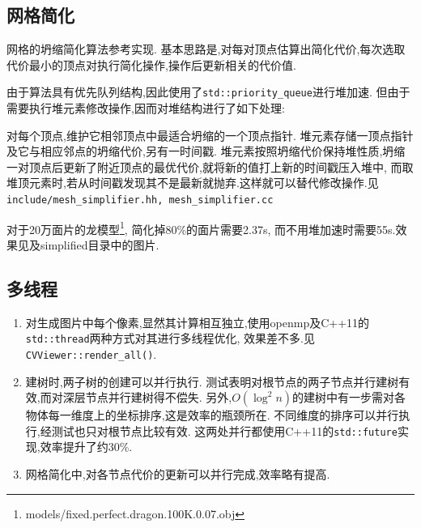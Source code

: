 \subsection{网格简化}
网格的坍缩简化算法参考\cite{mesh}实现.
基本思路是,对每对顶点估算出简化代价,每次选取代价最小的顶点对执行简化操作,操作后更新相关的代价值.

由于算法具有优先队列结构,因此使用了\verb|std::priority_queue|进行堆加速.
但由于需要执行堆元素修改操作,因而对堆结构进行了如下处理:

对每个顶点,维护它相邻顶点中最适合坍缩的一个顶点指针.
堆元素存储一顶点指针及它与相应邻点的坍缩代价,另有一时间戳.
堆元素按照坍缩代价保持堆性质,坍缩一对顶点后更新了附近顶点的最优代价,就将新的值打上新的时间戳压入堆中,
而取堆顶元素时,若从时间戳发现其不是最新就抛弃.这样就可以替代修改操作.见\verb|include/mesh_simplifier.hh, mesh_simplifier.cc|

对于20万面片的龙模型\footnote{models/fixed.perfect.dragon.100K.0.07.obj},
简化掉80\%的面片需要2.37s, 而不用堆加速时需要55s.效果见及simplified目录中的图片.

\subsection{多线程}
\begin{enumerate}
  \item 对生成图片中每个像素,显然其计算相互独立,使用openmp及C++11的\verb|std::thread|两种方式对其进行多线程优化,
    效果差不多.见\verb|CVViewer::render_all()|.

  \item 建树时,两子树的创建可以并行执行.
    测试表明对根节点的两子节点并行建树有效,而对深层节点并行建树得不偿失.
    另外,$O(\log^2 n)$的建树中有一步需对各物体每一维度上的坐标排序,这是效率的瓶颈所在.
    不同维度的排序可以并行执行,经测试也只对根节点比较有效.
    这两处并行都使用C++11的\verb|std::future|实现,效率提升了约30\%.

  \item 网格简化中,对各节点代价的更新可以并行完成,效率略有提高.
\end{enumerate}
